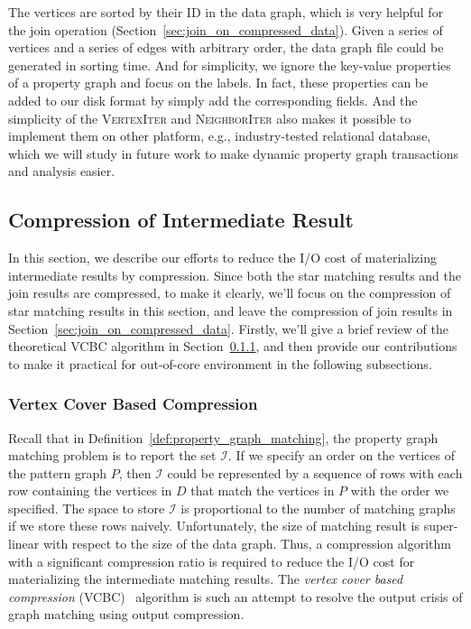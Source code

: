 The vertices are sorted by their ID in the data graph, which is very helpful for the join operation (Section~\ref{sec:join_on_compressed_data}).
Given a series of vertices and a series of edges with arbitrary order,
the data graph file could be generated in sorting time.
And for simplicity, we ignore the key-value properties of a property graph and focus on the labels.
In fact, these properties can be added to our disk format by simply add the corresponding fields.
And the simplicity of the \textsc{VertexIter} and \textsc{NeighborIter} also makes it possible to implement them on other platform, e.g., industry-tested relational database, which we will study in future work to make dynamic property graph transactions and analysis easier.
\subsection{Compression of Intermediate Result}\label{sec:compression_of_intermediate_result}
In this section, we describe our efforts to reduce the I/O cost of materializing intermediate results by compression.
Since both the star matching results and the join results are compressed,
to make it clearly, we'll focus on the compression of star matching results in this section,
and leave the compression of join results in Section~\ref{sec:join_on_compressed_data}.
Firstly, we'll give a brief review of the theoretical VCBC algorithm in Section~\ref{sec:vcbc},
and then provide our contributions to make it practical for out-of-core environment in the following subsections.
\subsubsection{Vertex Cover Based Compression}\label{sec:vcbc}
Recall that in Definition~\ref{def:property_graph_matching},
the property graph matching problem is to report the set $\mathcal{I}$.
If we specify an order on the vertices of the pattern graph $P$,
then $\mathcal{I}$ could be represented by a sequence of rows with each row containing the vertices in $D$ that match the vertices in $P$ with the order we specified.
The space to store $\mathcal{I}$ is proportional to the number of matching graphs if we store these rows naively.
Unfortunately, the size of matching result is super-linear with respect to the size of the data graph.
Thus, a compression algorithm with a significant compression ratio is required to reduce the I/O cost for materializing the intermediate matching results.
The \emph{vertex cover based compression} (VCBC)~\cite{DBLP:journals/pvldb/QiaoZC17} algorithm is such an attempt to resolve the output crisis of graph matching using output compression.

